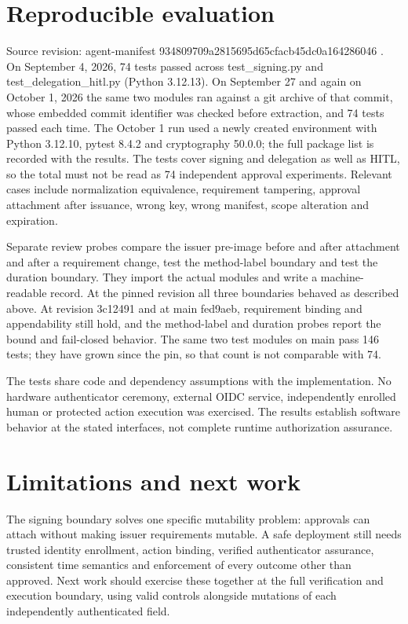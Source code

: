 \documentclass[10pt,letterpaper]{article}
\begin{document}
\section{Reproducible evaluation}

Source revision: agent-manifest 934809709a2815695d65cfacb45dc0a164286046 \cite{ref4}. On September 4, 2026, 74 tests passed across test\_signing.py and test\_delegation\_hitl.py (Python 3.12.13). On September 27 and again on October 1, 2026 the same two modules ran against a git archive of that commit, whose embedded commit identifier was checked before extraction, and 74 tests passed each time. The October 1 run used a newly created environment with Python 3.12.10, pytest 8.4.2 and cryptography 50.0.0; the full package list is recorded with the results. The tests cover signing and delegation as well as HITL, so the total must not be read as 74 independent approval experiments. Relevant cases include normalization equivalence, requirement tampering, approval attachment after issuance, wrong key, wrong manifest, scope alteration and expiration.


Separate review probes compare the issuer pre-image before and after attachment and after a requirement change, test the method-label boundary and test the duration boundary. They import the actual modules and write a machine-readable record. At the pinned revision all three boundaries behaved as described above. At revision 3c12491 and at main fed9aeb, requirement binding and appendability still hold, and the method-label and duration probes report the bound and fail-closed behavior. The same two test modules on main pass 146 tests; they have grown since the pin, so that count is not comparable with 74.


The tests share code and dependency assumptions with the implementation. No hardware authenticator ceremony, external OIDC service, independently enrolled human or protected action execution was exercised. The results establish software behavior at the stated interfaces, not complete runtime authorization assurance.


\section{Limitations and next work}

The signing boundary solves one specific mutability problem: approvals can attach without making issuer requirements mutable. A safe deployment still needs trusted identity enrollment, action binding, verified authenticator assurance, consistent time semantics and enforcement of every outcome other than approved. Next work should exercise these together at the full verification and execution boundary, using valid controls alongside mutations of each independently authenticated field.




{\raggedright}
\end{document}
